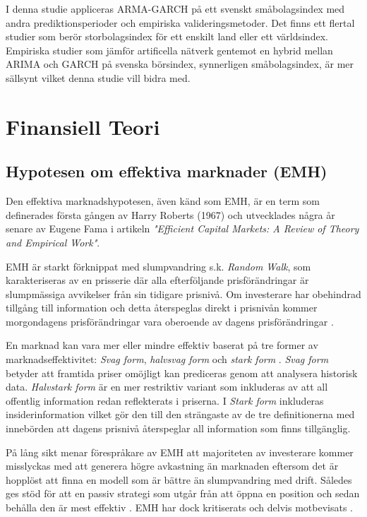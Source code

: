 \documentclass[11pt]{article}
\numberwithin{equation}{section}
\numberwithin{table}{section}
\numberwithin{figure}{section}
\begin{document}
I denna studie appliceras ARMA-GARCH på ett svenskt småbolagsindex med andra prediktionsperioder och empiriska valideringsmetoder. Det finns ett flertal studier som berör storbolagsindex för ett enskilt land eller ett världsindex. Empiriska studier som jämför artificella nätverk gentemot en hybrid mellan ARIMA och GARCH på svenska börsindex, synnerligen småbolagsindex, är mer sällsynt vilket denna studie vill bidra med. 

\newpage
\section{Finansiell Teori}

\subsection{Hypotesen om effektiva marknader (EMH)}
Den effektiva marknadshypotesen, även känd som EMH, är en term som definerades första gången av Harry Roberts (1967) och utvecklades några år senare av Eugene Fama \parencite*{Fama1970} i artikeln \emph{"Efficient Capital Markets: A Review of Theory and Empirical Work"}. 

EMH är starkt förknippat med slumpvandring s.k. \emph{Random Walk}, som karakteriseras av en prisserie där alla efterföljande prisförändringar är slumpmässiga avvikelser från sin tidigare prisnivå. Om investerare har obehindrad tillgång till information och detta återspeglas direkt i prisnivån kommer morgondagens prisförändringar vara oberoende av dagens prisförändringar \parencite{EMH}. 

En marknad kan vara mer eller mindre effektiv baserat på tre former av marknadseffektivitet: \emph{Svag form}, \emph{halvsvag form} och \emph{stark form} \parencite{Fama1970}. \emph{Svag form} betyder att framtida priser omöjligt kan prediceras genom att analysera historisk data. \emph{Halvstark form} är en mer restriktiv variant som inkluderas av att all offentlig information redan reflekterats i priserna. I \emph{Stark form} inkluderas insiderinformation vilket gör den till den strängaste av de tre definitionerna med innebörden att dagens prisnivå återspeglar all information som finns tillgänglig.

På lång sikt menar förespråkare av EMH att majoriteten av investerare kommer misslyckas med att generera högre avkastning än marknaden eftersom det är hopplöst att finna en modell som är bättre än slumpvandring med drift. Således ges stöd för att en passiv strategi som utgår från att öppna en position och sedan behålla den är mest effektiv \parencite{EMHforecast}. EMH har dock kritiserats och delvis motbevisats \parencite{basu1977investment, ball1978anomalies}.
\end{document}
